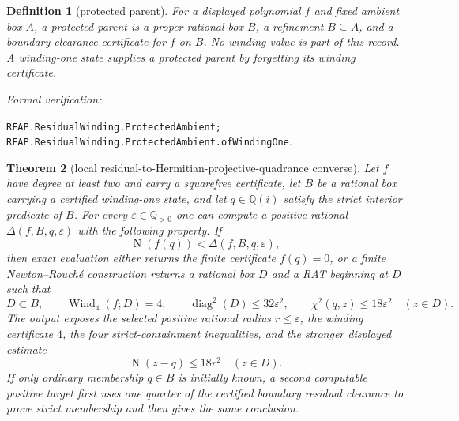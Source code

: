 \documentclass[11pt]{article}
\newtheorem{theorem}{Theorem}[section]
\newtheorem{definition}[theorem]{Definition}
\newcommand{\Qi}{\mathbb{Q}(i)}
\newcommand{\Q}{\mathbb{Q}}
\newcommand{\Norm}[1]{\operatorname{N}\!\left(#1\right)}
\newcommand{\Wind}{\operatorname{Wind}}
\newcommand{\diamq}{\operatorname{diag}^{2}}
\newcommand{\eps}{\varepsilon}
\newcommand{\leanref}[1]{\par\smallskip\noindent
  \emph{Formal verification:}\par\nobreak
  {\raggedright\nolinkurl{#1}.\par}}
\begin{document}
\begin{definition}[protected parent]
\label{def:protected-parent}
For a displayed polynomial $f$ and fixed ambient box $A$, a
\emph{protected parent} is a proper rational box $B$, a refinement
$B\subseteq A$, and a boundary-clearance certificate for $f$ on $B$.
No winding value is part of this record.  A winding-one state supplies a
protected parent by forgetting its winding certificate.
\end{definition}

\leanref{RFAP.ResidualWinding.ProtectedAmbient;
RFAP.ResidualWinding.ProtectedAmbient.ofWindingOne}

\begin{theorem}[local residual-to-Hermitian-projective-quadrance converse]
\label{thm:residual-projective-converse}
Let $f$ have degree at least two and carry a squarefree certificate, let $B$
be a rational box carrying a certified winding-one state, and let $q\in\Qi$
satisfy the strict interior predicate of $B$.  For every $\eps\in\Q_{>0}$ one can compute a
positive rational $\Delta(f,B,q,\eps)$ with the following property.  If
\[
                    \Norm{f(q)}<\Delta(f,B,q,\eps),
\]
then exact evaluation either returns the finite certificate $f(q)=0$, or a
finite Newton--Rouché construction returns a rational box $D$ and a RAT
beginning at $D$ such that
\[
 D\subset B,\qquad \Wind_4(f;D)=4,
 \qquad \diamq(D)\le32\eps^2,
 \qquad \chi^2(q,z)\le18\eps^2\quad(z\in D).
\]
The output exposes the selected positive rational radius $r\le\eps$, the
winding certificate $4$, the four strict-containment inequalities,
and the stronger displayed estimate
\[
                   \Norm{z-q}\le18r^2\quad(z\in D).
\]
If only ordinary membership $q\in B$ is initially known, a second computable
positive target first uses one quarter of the certified boundary residual
clearance to prove strict membership and then gives the same conclusion.
\end{theorem}
\end{document}
